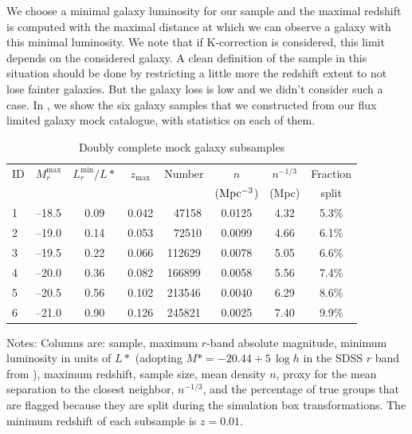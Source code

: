 We choose a minimal galaxy luminosity for our sample and the maximal redshift
is computed with the maximal distance at which we can observe a galaxy with
this minimal luminosity. We note that if K-correction is considered, this limit
depends on the considered galaxy. A clean definition of the sample in this
situation should be done by restricting a little more the redshift extent to
not lose fainter galaxies. But the galaxy loss is low and we didn't consider
such a case. In , we show the six galaxy samples that we
constructed from our flux limited galaxy mock catalogue, with statistics on
each of them.
%
\begin{table}[htb]
    \caption{Doubly complete mock galaxy subsamples\label{tab:samples}}
    \begin{center}
    \setlength{\tabcolsep}{3pt}
    \begin{tabular}{lccccccc}
    \toprule
    \toprule
    ID & $M_r^{\max}$ & $L_r^{\min}/L*$ & $z_{ \max }$ & Number & $n$
    & $n^{-1/3}$ & Fraction\\
              &            &     &                 &        & ($\rm  Mpc^{-3}$)
    & (Mpc) & split\\
    \toprule
    1 & --18.5 & 0.09 & 0.042 & \ \,47158 & 0.0125 & 4.32 & 5.3\%\\
    2 & --19.0 & 0.14 & 0.053 & \ \,72510 & 0.0099 & 4.66 & 6.1\%\\
    3 & --19.5 & 0.22 & 0.066 & 112629    & 0.0078 & 5.05 & 6.6\%\\
    4 & --20.0 & 0.36 & 0.082 & 166899    & 0.0058 & 5.56 & 7.4\%\\
    5 & --20.5 & 0.56 & 0.102 & 213546    & 0.0040 & 6.29 & 8.6\%\\
    6 & --21.0 & 0.90 & 0.126 & 245821    & 0.0025 & 7.40 & 9.9\%\\
    \bottomrule
    \end{tabular}
    \end{center}
    \parbox{\hsize}{\footnotesize Notes: Columns are: sample, maximum $r$-band absolute
    magnitude, minimum luminosity in units of $L*$ (adopting $M*=-20.44 +
    5\,\log h$ in the SDSS $r$ band from \citealp{Blanton+03}), maximum
    redshift, sample size, mean density $n$, proxy for the mean separation to
    the closest neighbor, $n^{-1/3}$, and the percentage of true groups that
    are flagged because they are split during the simulation box
    transformations. The minimum redshift of each subsample is $z=0.01$.
}
\end{table}

